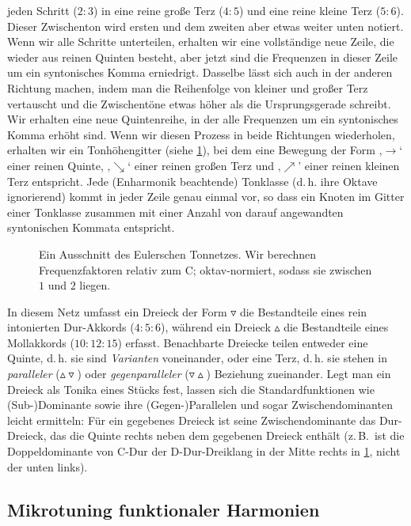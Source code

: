 \documentclass[ngerman,11pt]{scrartcl}
\begin{document}
jeden Schritt ($2:3$) in eine reine große Terz ($4:5$) und eine reine kleine
Terz ($5:6$). Dieser Zwischenton wird ersten und dem zweiten aber etwas weiter
unten notiert. Wenn wir alle Schritte unterteilen, erhalten wir eine
vollständige neue Zeile, die wieder aus reinen Quinten besteht, aber jetzt sind
die Frequenzen in dieser Zeile um ein syntonisches Komma erniedrigt. Dasselbe
lässt sich auch in der anderen Richtung machen, indem man die Reihenfolge von
kleiner und großer Terz vertauscht und die Zwischentöne etwas höher als die
Ursprungsgerade schreibt. Wir erhalten eine neue Quintenreihe, in der alle
Frequenzen um ein syntonisches Komma erhöht sind. Wenn wir diesen Prozess in
beide Richtungen wiederholen, erhalten wir ein Tonhöhengitter (siehe
\cref{fig:latticeExcerpt}), bei dem eine Bewegung der Form ‚$\to$‘ einer reinen
Quinte, ‚$\searrow$‘ einer reinen großen Terz und ‚$\nearrow$’ einer reinen
kleinen Terz entspricht. Jede (Enharmonik beachtende) Tonklasse (d.\,h. ihre
Oktave ignorierend) kommt in jeder Zeile genau einmal vor, so dass ein Knoten im
Gitter einer Tonklasse zusammen mit einer Anzahl von darauf angewandten
syntonischen Kommata entspricht.

\begin{figure}[h]
  
  \caption{Ein Ausschnitt des Eulerschen Tonnetzes. Wir berechnen
  	Frequenzfaktoren relativ zum C; oktav-normiert, sodass sie zwischen $1$
  	und $2$ liegen.}\label{fig:latticeExcerpt}
\end{figure}

In diesem Netz umfasst ein Dreieck der Form $\triangledown$ die Bestandteile 
eines rein intonierten Dur-Akkords ($4:5:6$), während ein Dreieck $\vartriangle$
die Bestandteile eines Mollakkords ($10:12:15$) erfasst. Benachbarte Dreiecke
teilen entweder eine Quinte, d.\,h. sie sind \emph{Varianten} voneinander, oder
eine Terz, d.\,h. sie stehen in \emph{paralleler}
($\vartriangle\!\!\!\triangledown$) oder \emph{gegenparalleler}
($\triangledown\!\!\!\vartriangle$) Beziehung zueinander. Legt man ein Dreieck
als Tonika eines Stücks fest, lassen sich die Standardfunktionen wie
(Sub-)Dominante sowie ihre (Gegen-)Parallelen und sogar Zwischendominanten
leicht ermitteln: Für ein gegebenes Dreieck ist seine Zwischendominante das
Dur-Dreieck, das die Quinte rechts neben dem gegebenen Dreieck enthält (z.\,B.\
ist die Doppeldominante von C-Dur der D-Dur-Dreiklang in der Mitte rechts in
\cref{fig:latticeExcerpt}, nicht der unten links).

\subsection{Mikrotuning funktionaler Harmonien}
\end{document}
